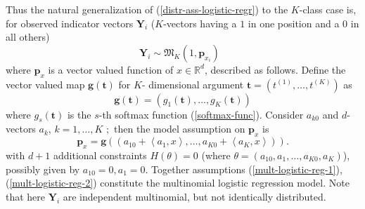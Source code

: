 \documentclass[11pt,twoside]{article}%
\theoremstyle{change}
\begin{document}
Thus the natural generalization of (\ref{distr-ass-logistic-regr}) to the
$K$-class case is, for observed indicator vectors $\mathbf{Y}_{i}$
($K$-vectors having a $1$ in one position and a $0$ in all others)
\begin{equation}
\mathbf{Y}_{i}\sim\mathfrak{M}_{K}(1,\mathbf{p}_{x_{i}})\text{ }%
\label{mult-logistic-reg-1}%
\end{equation}
where $\mathbf{p}_{x}$ is a vector valued function of $x\in\mathbb{R}^{d}$,
described as follows. Define the vector valued map $\mathbf{g}(\mathbf{t})$
for $K$- dimensional argument $\mathbf{t}=(t^{(1)},\ldots,t^{(K)})$ as
\[
\mathbf{g}(\mathbf{t})=\left(  g_{1}(\mathbf{t}),\ldots,g_{K}(\mathbf{t}%
)\right)
\]
where $g_{s}(\mathbf{t})$ is the $s$-th softmax function (\ref{softmax-func}).
Consider $a_{k0}$ and $d$-vectors $a_{k}$, $k=1,\ldots,K$ $;$ then the model
assumption on $\mathbf{p}_{x}$ is
\begin{equation}
\mathbf{p}_{x}=\mathbf{g}\left(  (a_{10}+\left\langle a_{1},x\right\rangle
,\ldots,a_{K0}+\left\langle a_{K},x\right\rangle )\right)
.\label{mult-logistic-reg-2}%
\end{equation}
with $d+1$ additional constraints $H(\theta)=0$ (where $\theta=\left(
a_{10},a_{1},\ldots,a_{K0},a_{K}\right)  $), possibly given by $a_{10}%
=0,a_{1}=0$. Together assumptions (\ref{mult-logistic-reg-1}),
(\ref{mult-logistic-reg-2}) constitute the multinomial logistic regression
model. Note that here $\mathbf{Y}_{i}$ are independent multinomial, but not
identically distributed.
\end{document}
